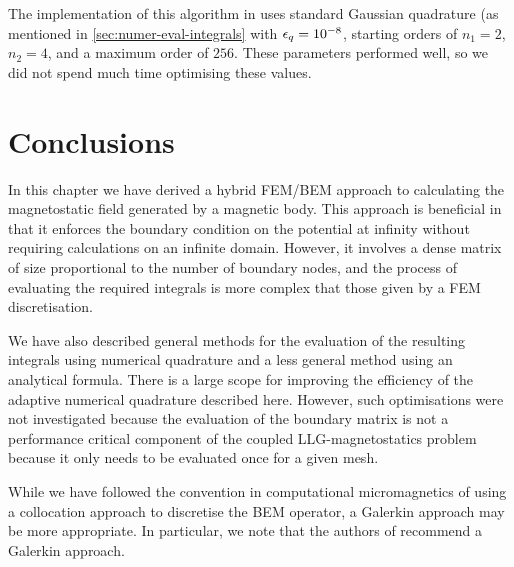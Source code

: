 The implementation of this algorithm in \oomph uses standard Gaussian quadrature (as mentioned in \cref{sec:numer-eval-integrals} with $\epsilon_q = 10^{-8}$, starting orders of $n_1=2$, $n_2=4$, and a maximum order of $256$.
These parameters performed well, so we did not spend much time optimising these values.


\section{Conclusions}

In this chapter we have derived a hybrid FEM/BEM approach to calculating the magnetostatic field generated by a magnetic body.
This approach is beneficial in that it enforces the boundary condition on the potential at infinity without requiring calculations on an infinite domain.
However, it involves a dense matrix of size proportional to the number of boundary nodes, and the process of evaluating the required integrals is more complex that those given by a FEM discretisation.

We have also described general methods for the evaluation of the resulting integrals using numerical quadrature and a less general method using an analytical formula.
There is a large scope for improving the efficiency of the adaptive numerical quadrature described here.
However, such optimisations were not investigated because the evaluation of the boundary matrix is not a performance critical component of the coupled LLG-magnetostatics problem because it only needs to be evaluated once for a given mesh.

While we have followed the convention in computational micromagnetics of using a collocation approach to discretise the BEM operator, a Galerkin approach may be more appropriate.
In particular, we note that the authors of \hlib recommend a Galerkin approach.

